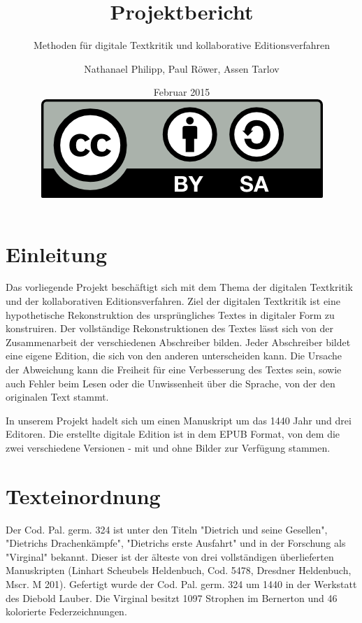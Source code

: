 \documentclass[a4paper, 12pt, oneside]{scrbook}
\author{Nathanael Philipp, Paul Röwer, Assen Tarlov}
\title{Projektbericht}
\subtitle{Methoden für digitale Textkritik und kollaborative Editionsverfahren}
\date{Februar 2015\\\vspace{20em}\includegraphics{by-sa.png}}
\begin{document}
\maketitle\newpage
\tableofcontents\newpage
\chapter{Einleitung}

Das vorliegende Projekt beschäftigt sich mit dem Thema der digitalen Textkritik und der kollaborativen Editionsverfahren. 
Ziel der digitalen Textkritik ist eine hypothetische Rekonstruktion des ursprüngliches Textes in digitaler Form zu konstruiren. Der vollständige Rekonstruktionen des Textes lässt sich von der Zusammenarbeit der verschiedenen Abschreiber bilden. Jeder Abschreiber bildet eine eigene Edition, die sich von den anderen unterscheiden kann. Die Ursache der Abweichung kann die Freiheit für eine Verbesserung des Textes sein, sowie auch Fehler beim Lesen oder die Unwissenheit über die Sprache, von der den originalen Text stammt.  

In unserem Projekt hadelt sich um einen Manuskript um das 1440 Jahr und drei Editoren. Die erstellte digitale Edition ist in dem EPUB Format, von dem die zwei verschiedene Versionen - mit und ohne Bilder zur Verfügung stammen. 


\chapter{Texteinordnung}
Der Cod. Pal. germ. 324 ist unter den Titeln "Dietrich und seine Gesellen", "Dietrichs Drachenkämpfe", "Dietrichs erste Ausfahrt" und in der Forschung als "Virginal" bekannt. Dieser ist der älteste von drei vollständigen überlieferten Manuskripten (Linhart Scheubels Heldenbuch, Cod. 5478, Dresdner Heldenbuch, Mscr. M 201). Gefertigt wurde der Cod. Pal. germ. 324 um 1440 in der Werkstatt des Diebold Lauber. Die Virginal besitzt 1097 Strophen im Bernerton und 46 kolorierte Federzeichnungen.\cite{ubheidelber_bibpal}
\end{document}
